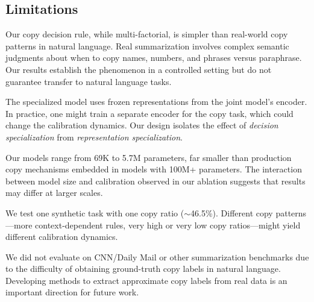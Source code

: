 \subsection{Limitations}
\label{sec:limitations}

 Our copy decision rule, while multi-factorial, is simpler than real-world copy patterns in natural language. Real summarization involves complex semantic judgments about when to copy names, numbers, and phrases versus paraphrase. Our results establish the phenomenon in a controlled setting but do not guarantee transfer to natural language tasks.

 The specialized model uses frozen representations from the joint model's encoder. In practice, one might train a separate encoder for the copy task, which could change the calibration dynamics. Our design isolates the effect of \emph{decision specialization} from \emph{representation specialization}.

 Our models range from 69K to 5.7M parameters, far smaller than production copy mechanisms embedded in models with 100M+ parameters. The interaction between model size and calibration observed in our ablation suggests that results may differ at larger scales.

 We test one synthetic task with one copy ratio ($\sim$46.5\%). Different copy patterns---more context-dependent rules, very high or very low copy ratios---might yield different calibration dynamics.

 We did not evaluate on CNN/Daily Mail or other summarization benchmarks due to the difficulty of obtaining ground-truth copy labels in natural language. Developing methods to extract approximate copy labels from real data is an important direction for future work.